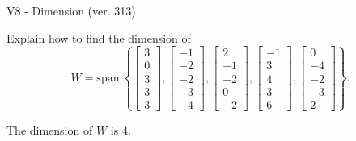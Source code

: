 \begin{exercise}
  \begin{exerciseTitle}V8 - Dimension (ver. 313)\end{exerciseTitle}
  \begin{exerciseStatement}
    Explain how to find the dimension of 
\[W=\mathrm{span}\ \left\{\left[\begin{array}{r}
3 \\
0 \\
3 \\
3 \\
3
\end{array}\right] , \left[\begin{array}{r}
-1 \\
-2 \\
-2 \\
-3 \\
-4
\end{array}\right] , \left[\begin{array}{r}
2 \\
-1 \\
-2 \\
0 \\
-2
\end{array}\right] , \left[\begin{array}{r}
-1 \\
3 \\
4 \\
3 \\
6
\end{array}\right] , \left[\begin{array}{r}
0 \\
-4 \\
-2 \\
-3 \\
2
\end{array}\right]\right\}.\]



  \end{exerciseStatement}
  \begin{exerciseAnswer}
   The dimension of \(W\) is  \(4\).
  


  \end{exerciseAnswer}
\end{exercise}